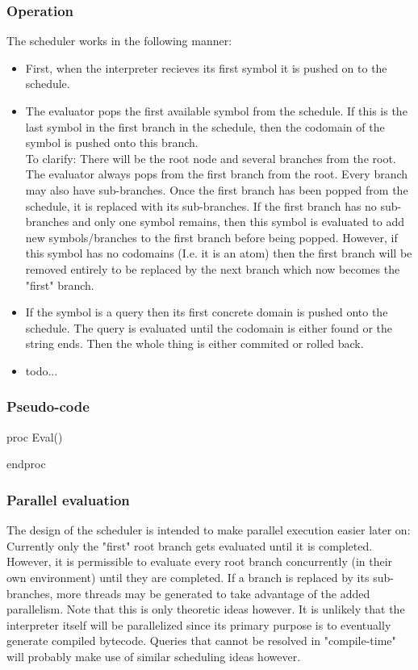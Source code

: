 \documentclass[a4paper,11pt]{article}
\begin{document}
\subsubsection{Operation}
The scheduler works in the following manner:
\begin{itemize}
\item First, when the interpreter recieves its first symbol it is pushed on to the schedule.
\item The evaluator pops the first available symbol from the schedule. If this is the last symbol in the first branch in the schedule, then the codomain of the symbol is pushed onto this branch.\\
To clarify: There will be the root node and several branches from the root. 
The evaluator always pops from the first branch from the root. 
Every branch may also have sub-branches. 
Once the first branch has been popped from the schedule, it is replaced with its sub-branches. 
If the first branch has no sub-branches and only one symbol remains, then this symbol is evaluated to add new symbols/branches to the first branch before being popped.
However, if this symbol has no codomains (I.e. it is an atom) then the first branch will be removed entirely to be replaced by the next branch which now becomes the "first" branch.
\item If the symbol is a query then its first concrete domain is pushed onto the schedule. The query is evaluated until the codomain is either found or the string ends. 
Then the whole thing is either commited or rolled back.
\item todo...
\end{itemize}

\subsubsection{Pseudo-code}
\begin{algorithmic}
proc Eval()
  
endproc
\end{algorithmic}

\subsubsection{Parallel evaluation}
The design of the scheduler is intended to make parallel execution easier later on: Currently only the "first" root branch gets evaluated until it is completed.
However, it is permissible to evaluate every root branch concurrently (in their own environment) until they are completed. 
If a branch is replaced by its sub-branches, more threads may be generated to take advantage of the added parallelism.
Note that this is only theoretic ideas however. 
It is unlikely that the interpreter itself will be parallelized since its primary purpose is to eventually generate compiled bytecode.
Queries that cannot be resolved in "compile-time" will probably make use of similar scheduling ideas however.
\end{document}
